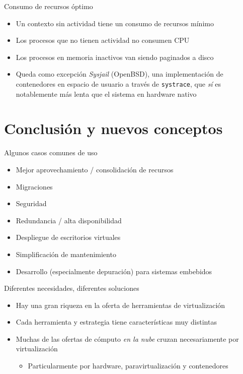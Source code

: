 \documentclass[presentation]{beamer}
\begin{document}
\begin{frame}[label={sec:org9a783f0},fragile]{Consumo de recursos óptimo}
 \begin{itemize}
\item Un contexto sin actividad tiene un consumo de recursos mínimo
\item Los procesos que no tienen actividad no consumen CPU
\item Los procesos en memoria inactivos van siendo paginados a disco
\item Queda como excepción \emph{Sysjail} (OpenBSD), una implementación de
contenedores en espacio de usuario a través de \texttt{systrace}, que \emph{sí}
es notablemente más lenta que el sistema en hardware nativo
\end{itemize}
\end{frame}


\section{Conclusión y nuevos conceptos}
\label{sec:org6efed40}
\begin{frame}[label={sec:org62e20a2}]{Algunos casos comunes de uso}
\begin{itemize}
\item Mejor aprovechamiento / consolidación de recursos
\item Migraciones
\item Seguridad
\item Redundancia / alta disponibilidad
\item Despliegue de escritorios virtuales
\item Simplificación de mantenimiento
\item Desarrollo (especialmente depuración) para sistemas embebidos
\end{itemize}
\end{frame}

\begin{frame}[label={sec:orgfdfc715}]{Diferentes necesidades, diferentes soluciones}
\begin{itemize}
\item Hay una gran riqueza en la oferta de herramientas de virtualización
\item Cada herramienta y estrategia tiene características muy distintas
\item Muchas de las ofertas de cómputo \emph{en la nube} cruzan necesariamente
por virtualización
\begin{itemize}
\item Particularmente por hardware, paravirtualización y contenedores
\end{itemize}
\end{itemize}
\end{frame}
\end{document}
